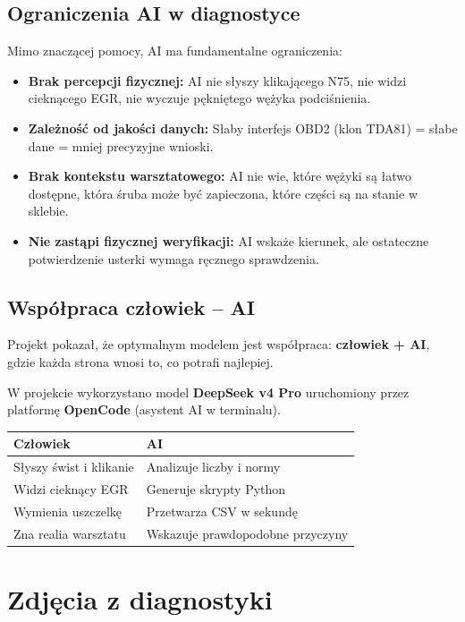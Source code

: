 \documentclass[12pt,a4paper]{article}
\begin{document}
\subsection{Ograniczenia AI w diagnostyce}

Mimo znaczącej pomocy, AI ma fundamentalne ograniczenia:

\begin{itemize}
    \item \textbf{Brak percepcji fizycznej:} AI nie słyszy klikającego N75,
          nie widzi cieknącego EGR, nie wyczuje pękniętego wężyka podciśnienia.
    \item \textbf{Zależność od jakości danych:} Słaby interfejs OBD2 (klon TDA81)
          = słabe dane = mniej precyzyjne wnioski.
    \item \textbf{Brak kontekstu warsztatowego:} AI nie wie, które wężyki są
          łatwo dostępne, która śruba może być zapieczona, które części są
          na stanie w sklebie.
    \item \textbf{Nie zastąpi fizycznej weryfikacji:} AI wskaże kierunek,
          ale ostateczne potwierdzenie usterki wymaga ręcznego sprawdzenia.
\end{itemize}

\subsection{Współpraca człowiek – AI}

Projekt pokazał, że optymalnym modelem jest współpraca:
\textbf{człowiek + AI}, gdzie każda strona wnosi to, co potrafi najlepiej.

W projekcie wykorzystano model \textbf{DeepSeek v4 Pro} uruchomiony
przez platformę \textbf{OpenCode} (asystent AI w terminalu).

\begin{tabular}{lp{8cm}}
\toprule
\textbf{Człowiek} & \textbf{AI} \\
\midrule
Słyszy świst i klikanie & Analizuje liczby i normy \\
Widzi cieknący EGR & Generuje skrypty Python \\
Wymienia uszczelkę & Przetwarza CSV w sekundę \\
Zna realia warsztatu & Wskazuje prawdopodobne przyczyny \\
\bottomrule
\end{tabular}

\section{Zdjęcia z diagnostyki}
\end{document}
